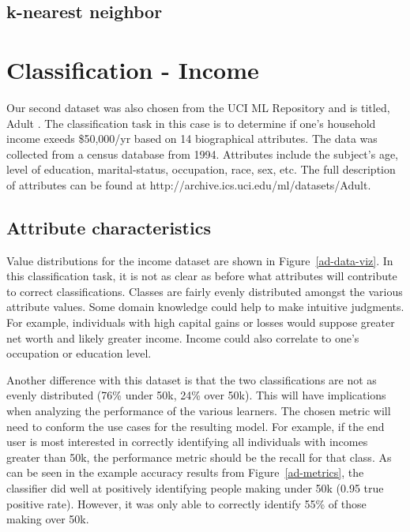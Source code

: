 \documentclass{sig-alternate}
\begin{document}
\subsection{k-nearest neighbor}






\section{Classification - Income}

Our second dataset was also chosen from the UCI ML Repository and is titled, Adult \cite{Bache+Lichman:2013}. The classification task in this case is to determine if one's household income exeeds \$50,000/yr based on 14 biographical attributes. The data was collected from a census database from 1994. Attributes include the subject's age, level of education, marital-status, occupation, race, sex, etc. The full description of attributes can be found at http://archive.ics.uci.edu/ml/datasets/Adult.

\subsection{Attribute characteristics}

Value distributions for the income dataset are shown in Figure~\ref{ad-data-viz}. In this classification task, it is not as clear as before what attributes will contribute to correct classifications. Classes are fairly evenly distributed amongst the various attribute values. Some domain knowledge could help to make intuitive judgments. For example, individuals with high capital gains or losses would suppose greater net worth and likely greater income. Income could also correlate to one's occupation or education level.

Another difference with this dataset is that the two classifications are not as evenly distributed (76\% under 50k, 24\% over 50k). This will have implications when analyzing the performance of the various learners. The chosen metric will need to conform the use cases for the resulting model. For example, if the end user is most interested in correctly identifying all individuals with incomes greater than 50k, the performance metric should be the recall for that class. As can be seen in the example accuracy results from Figure~\ref{ad-metrics}, the classifier did well at positively identifying people making under 50k (0.95 true positive rate). However, it was only able to correctly identify 55\% of those making over 50k.
\end{document}

